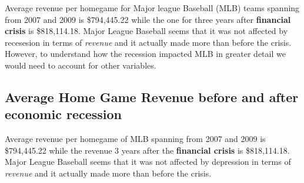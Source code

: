 \documentclass[man, fleqn, noextraspace,floatsintext]{apa6}
\newenvironment{Shaded}{\begin{snugshade}}{\end{snugshade}}
\newcommand{\KeywordTok}[1]{\textcolor[rgb]{0.13,0.29,0.53}{\textbf{#1}}}
\newcommand{\DataTypeTok}[1]{\textcolor[rgb]{0.13,0.29,0.53}{#1}}
\newcommand{\DecValTok}[1]{\textcolor[rgb]{0.00,0.00,0.81}{#1}}
\newcommand{\StringTok}[1]{\textcolor[rgb]{0.31,0.60,0.02}{#1}}
\newcommand{\OtherTok}[1]{\textcolor[rgb]{0.56,0.35,0.01}{#1}}
\newcommand{\OperatorTok}[1]{\textcolor[rgb]{0.81,0.36,0.00}{\textbf{#1}}}
\newcommand{\NormalTok}[1]{#1}
\begin{document}
\begin{Shaded}
\end{Shaded}

Average revenue per homegame for Major league Baseball (MLB) teams
spanning from 2007 and 2009 is \$794,445.22 while the one for three
years after \textbf{financial crisis} is \$818,114.18. Major League
Baseball seems that it was not affected by recesesion in terms of
\emph{revenue} and it actually made more than before the crisis.
However, to understand how the recession impacted MLB in greater detail
we would need to account for other variables.

\subsection{Average Home Game Revenue before and after economic
recession}\label{average-home-game-revenue-before-and-after-economic-recession}

Average revenue per homegame of MLB spanning from 2007 and 2009 is
\$794,445.22 while the revenue 3 years after the \textbf{financial
crisis} is \$818,114.18. Major League Baseball seems that it was not
affected by depression in terms of \emph{revenue} and it actually made
more than before the crisis.
\end{document}
